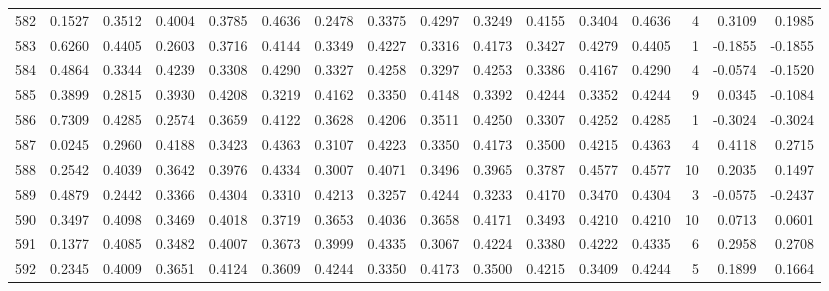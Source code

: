 \begin{tabular}{lrrrrrrrrrrrrrrr}
582 &      0.1527 &  0.3512 &  0.4004 &  0.3785 &  0.4636 &  0.2478 &  0.3375 &  0.4297 &  0.3249 &  0.4155 &   0.3404 &     0.4636 &      4 &                    0.3109 &                     0.1985 \\
583 &      0.6260 &  0.4405 &  0.2603 &  0.3716 &  0.4144 &  0.3349 &  0.4227 &  0.3316 &  0.4173 &  0.3427 &   0.4279 &     0.4405 &      1 &                   -0.1855 &                    -0.1855 \\
584 &      0.4864 &  0.3344 &  0.4239 &  0.3308 &  0.4290 &  0.3327 &  0.4258 &  0.3297 &  0.4253 &  0.3386 &   0.4167 &     0.4290 &      4 &                   -0.0574 &                    -0.1520 \\
585 &      0.3899 &  0.2815 &  0.3930 &  0.4208 &  0.3219 &  0.4162 &  0.3350 &  0.4148 &  0.3392 &  0.4244 &   0.3352 &     0.4244 &      9 &                    0.0345 &                    -0.1084 \\
586 &      0.7309 &  0.4285 &  0.2574 &  0.3659 &  0.4122 &  0.3628 &  0.4206 &  0.3511 &  0.4250 &  0.3307 &   0.4252 &     0.4285 &      1 &                   -0.3024 &                    -0.3024 \\
587 &      0.0245 &  0.2960 &  0.4188 &  0.3423 &  0.4363 &  0.3107 &  0.4223 &  0.3350 &  0.4173 &  0.3500 &   0.4215 &     0.4363 &      4 &                    0.4118 &                     0.2715 \\
588 &      0.2542 &  0.4039 &  0.3642 &  0.3976 &  0.4334 &  0.3007 &  0.4071 &  0.3496 &  0.3965 &  0.3787 &   0.4577 &     0.4577 &     10 &                    0.2035 &                     0.1497 \\
589 &      0.4879 &  0.2442 &  0.3366 &  0.4304 &  0.3310 &  0.4213 &  0.3257 &  0.4244 &  0.3233 &  0.4170 &   0.3470 &     0.4304 &      3 &                   -0.0575 &                    -0.2437 \\
590 &      0.3497 &  0.4098 &  0.3469 &  0.4018 &  0.3719 &  0.3653 &  0.4036 &  0.3658 &  0.4171 &  0.3493 &   0.4210 &     0.4210 &     10 &                    0.0713 &                     0.0601 \\
591 &      0.1377 &  0.4085 &  0.3482 &  0.4007 &  0.3673 &  0.3999 &  0.4335 &  0.3067 &  0.4224 &  0.3380 &   0.4222 &     0.4335 &      6 &                    0.2958 &                     0.2708 \\
592 &      0.2345 &  0.4009 &  0.3651 &  0.4124 &  0.3609 &  0.4244 &  0.3350 &  0.4173 &  0.3500 &  0.4215 &   0.3409 &     0.4244 &      5 &                    0.1899 &                     0.1664 \\

\end{tabular}
